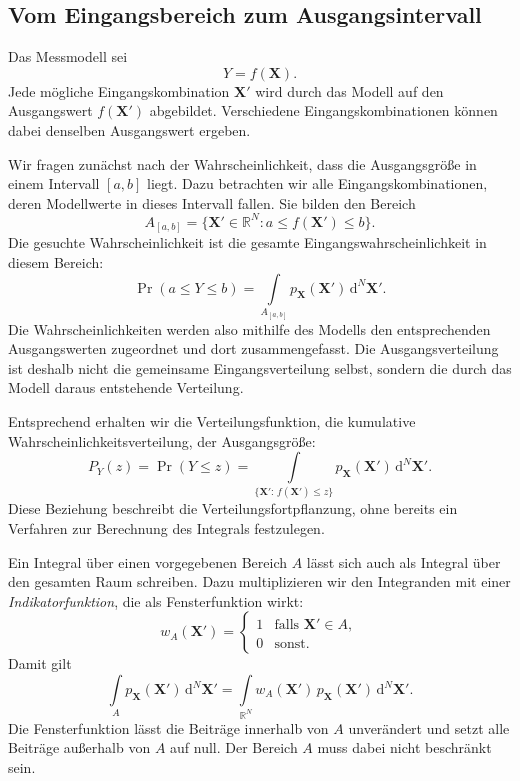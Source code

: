 \subsection{Vom Eingangsbereich zum Ausgangsintervall}

Das Messmodell sei
\begin{equation}
Y=f(\mathbf X).
\end{equation}
Jede mögliche Eingangskombination $\mathbf X'$ wird durch das Modell
auf den Ausgangswert $f(\mathbf X')$ abgebildet.
Verschiedene Eingangskombinationen können dabei denselben
Ausgangswert ergeben.

Wir fragen zunächst nach der Wahrscheinlichkeit, dass die
Ausgangsgröße in einem Intervall $[a,b]$ liegt.
Dazu betrachten wir alle Eingangskombinationen, deren Modellwerte
in dieses Intervall fallen. Sie bilden den Bereich
\begin{equation}
A_{[a,b]}
=\bigl\{\mathbf X'\in\mathbb R^N:
a\leq f(\mathbf X')\leq b\bigr\}.
\label{eq:integrationsbereich}
\end{equation}
Die gesuchte Wahrscheinlichkeit ist die gesamte
Eingangswahrscheinlichkeit in diesem Bereich:
\begin{equation}
\boxed{
\Pr(a\leq Y\leq b)
=\int\limits_{A_{[a,b]}}p_{\mathbf X}(\mathbf X')\,
\mathrm d^N\mathbf X'.
}
\label{eq:AusgangsintervallEingangsraum11}
\end{equation}
Die Wahrscheinlichkeiten werden also mithilfe des Modells den
entsprechenden Ausgangswerten zugeordnet und dort zusammengefasst.
Die Ausgangsverteilung ist deshalb nicht die gemeinsame
Eingangsverteilung selbst, sondern die durch das Modell daraus
entstehende Verteilung.

Entsprechend erhalten wir die Verteilungsfunktion, die kumulative Wahrscheinlichkeitsverteilung, der Ausgangsgröße:
\begin{equation}
P_Y(z)=\Pr(Y\leq z)
=\int\limits_{\{\mathbf X':\,f(\mathbf X')\leq z\}}
p_{\mathbf X}(\mathbf X')\,\mathrm d^N\mathbf X'.
\label{eq:VerteilungsfunktionFortpflanzung11}
\end{equation}
Diese Beziehung beschreibt die Verteilungsfortpflanzung, ohne
bereits ein Verfahren zur Berechnung des Integrals festzulegen.

Ein Integral über einen vorgegebenen Bereich $A$ lässt sich
auch als Integral über den gesamten Raum schreiben.
Dazu multiplizieren wir den Integranden mit einer
\textsl{Indikatorfunktion}, die als Fensterfunktion wirkt:
\begin{equation}
w_A(\mathbf X')
=
\begin{cases}
1 & \text{falls }\mathbf X'\in A,\\
0 & \text{sonst}.
\end{cases}
\end{equation}
Damit gilt
\begin{equation}
\int\limits_A p_{\mathbf X}(\mathbf X')\,\mathrm d^N\mathbf X'
=
\int\limits_{\mathbb R^N}
w_A(\mathbf X')\,p_{\mathbf X}(\mathbf X')\,
\mathrm d^N\mathbf X'.
\end{equation}
Die Fensterfunktion lässt die Beiträge innerhalb von $A$
unverändert und setzt alle Beiträge außerhalb von $A$ auf null.
Der Bereich $A$ muss dabei nicht beschränkt sein.

